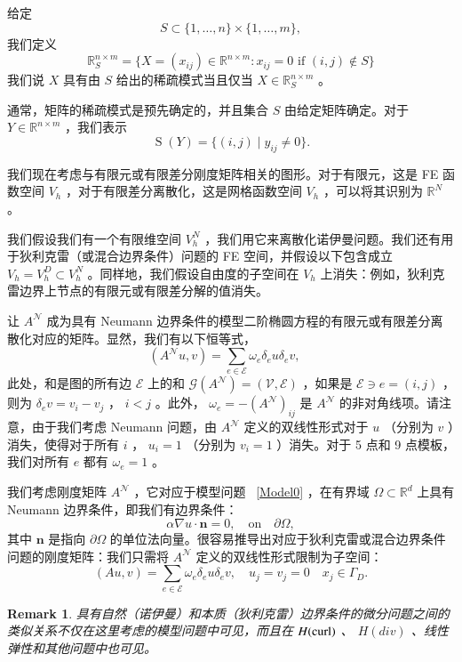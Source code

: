\documentclass[12pt]{acta_2011xz}
\newcommand{\sparse}{\ensuremath{\operatorname{S}}}
\newcommand{\curl}{{\rm curl }}
\newtheorem{remark}[theorem]{Remark}
\begin{document}
给定 
   $$
S\subset  \{ 1,\ldots,n \} \times \{ 1,\ldots,m \} ,  
$$    我们定义 
   \begin{equation}
  \label{ZS}
\mathbb R_S^{n\times m}=\bigg \{ X=(x_{ij})\in \mathbb R^{n\times m}:  x_{ij}=0 \mbox{ if } (i,j)\notin S\bigg \} 
\end{equation}    我们说    $X$    具有由    $S$    给出的稀疏模式当且仅当    $X\in
\mathbb R_S^{n\times m}$    。  

通常，矩阵的稀疏模式是预先确定的，并且集合    $S$    由给定矩阵确定。对于    $Y\in
\mathbb{R}^{n\times m}$   ，我们表示
   \[
\sparse(Y) = \big \{ (i,j)\;\big|\; y_{ij}\neq 0\big \} .
\]     

我们现在考虑与有限元或有限差分刚度矩阵相关的图形。对于有限元，这是 FE 函数空间
   $V_h$    ，对于有限差分离散化，这是网格函数空间    $V_h$    ，可以将其识别为
   $\mathbb{R}^N$    。  

我们假设我们有一个有限维空间    $V_h^N$   ，我们用它来离散化诺伊曼问题。我们还有用于狄利克雷（或混合边界条件）问题的 FE 空间，并假设以下包含成立    $V_h=V_h^D\subset V_h^N$    。同样地，我们假设自由度的子空间在    $V_h$    上消失：例如，狄利克雷边界上节点的有限元或有限差分解的值消失。  

让    $A^{\mathcal N}$    成为具有 Neumann 边界条件的模型二阶椭圆方程的有限元或有限差分离散化对应的矩阵。显然，我们有以下恒等式，
   \begin{equation}\label{neu}
(A^{\mathcal N}u,v) = \sum_{e\in \mathcal{E}} \omega_e \delta_e u \delta_e v, \quad 
\end{equation}    此处，和是图的所有边    $\mathcal{E}$    上的和
   $\mathcal{G}(A^{\mathcal N}) = (\mathcal{V},\mathcal{E})$    ，如果是    $\mathcal{E}\ni e=(i,j)$    ，则为    $\delta_e v
= v_i - v_j$    ，    $i<j$    。此外，   $\omega_e= -
(A^{\mathcal{N}})_{ij}$    是
   $A^{\mathcal{N}}$    的非对角线项。请注意，由于我们考虑 Neumann 问题，由    $A^{\mathcal{N}}$    定义的双线性形式对于    $u$   （分别为    $v$   ）消失，使得对于所有    $i$    ，   $u_i=1$   （分别为    $v_i=1$   ）消失。对于 5 点和 9 点模板，我们对所有    $e$    都有    $\omega_e=1$    。  

我们考虑刚度矩阵    $A^{\mathcal N}$    ，它对应于模型问题~    \eqref{Model0}   ，在有界域    $\Omega\subset \mathbb{R}^d$    上具有 Neumann 边界条件，即我们有边界条件：
   \begin{equation}\label{like-laplace}
\alpha\nabla u\cdot\bm{n} = 0, \quad \mbox{on}\quad\partial\Omega,
\end{equation}    其中    $\bm{n}$    是指向    $\partial \Omega$    的单位法向量。很容易推导出对应于狄利克雷或混合边界条件问题的刚度矩阵：我们只需将    $A^{\mathcal N}$    定义的双线性形式限制为子空间：
   \begin{equation}\label{bilinear1}
(Au,v) = \sum_{e\in \mathcal{E}} \omega_e \delta_e u \delta_e v, \quad
u_j=v_j=0\quad x_j\in \Gamma_D.  
\end{equation}    
   \begin{remark}具有自然（诺伊曼）和本质（狄利克雷）边界条件的微分问题之间的类似关系不仅在这里考虑的模型问题中可见，而且在    $H(\curl)$   、   $H(div)$   、线性弹性和其他问题中也可见。  \end{remark}     
\end{document}
